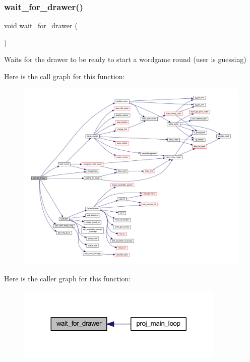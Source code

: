 \subsubsection{\texorpdfstring{wait\+\_\+for\+\_\+drawer()}{wait\_for\_drawer()}}
{\footnotesize\ttfamily void wait\+\_\+for\+\_\+drawer (\begin{DoxyParamCaption}{ }\end{DoxyParamCaption})}



Waits for the drawer to be ready to start a wordgame round (user is guessing) 

Here is the call graph for this function\+:
\nopagebreak
\begin{figure}[H]
\begin{center}
\leavevmode
\includegraphics[width=350pt]{group__pengoo_ga45d4be7b19d3dd0ea742f0a489112c80_cgraph}
\end{center}
\end{figure}
Here is the caller graph for this function\+:\nopagebreak
\begin{figure}[H]
\begin{center}
\leavevmode
\includegraphics[width=281pt]{group__pengoo_ga45d4be7b19d3dd0ea742f0a489112c80_icgraph}
\end{center}
\end{figure}
\mbox{\label{group__pengoo_ga19cfab1706132a19749fc519f84d9445}} 
